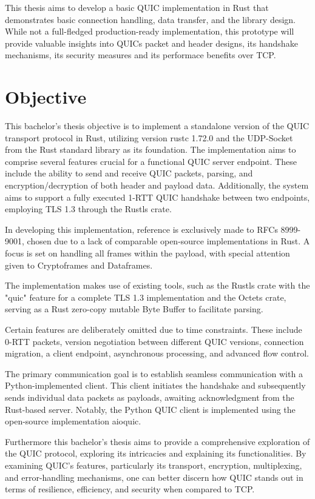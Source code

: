 This thesis aims to develop a basic QUIC implementation in Rust that demonstrates basic connection
handling, data transfer, and the library design. While not a full-fledged production-ready
implementation, this prototype will provide valuable insights into QUICs packet and header designs,
its handshake mechanisms, its security measures and its performace benefits over TCP.

\section{Objective}

This bachelor's thesis objective is to implement a standalone version of the QUIC transport protocol in Rust,
utilizing version rustc 1.72.0 and the UDP-Socket from the Rust standard library as its foundation. The
implementation aims to comprise several features crucial for a functional QUIC server endpoint. These include
the ability to send and receive QUIC packets, parsing, and encryption/decryption of both header and payload data.
Additionally, the system aims to support a fully executed 1-RTT QUIC handshake between two endpoints, employing
TLS 1.3 through the Rustls crate.

In developing this implementation, reference is exclusively made to RFCs 8999-9001, chosen due to a lack of
comparable open-source implementations in Rust. A focus is set on handling all frames within the payload,
with special attention given to Cryptoframes and Dataframes.

The implementation makes use of existing tools, such as the Rustls crate with the "quic" feature for a
complete TLS 1.3 implementation and the Octets crate, serving as a Rust zero-copy mutable Byte Buffer to
facilitate parsing.

Certain features are deliberately omitted due to time constraints. These include 0-RTT packets, version
negotiation between different QUIC versions, connection migration, a client endpoint, asynchronous processing,
and advanced flow control.

The primary communication goal is to establish seamless communication with a Python-implemented client.
This client initiates the handshake and subsequently sends individual data packets as payloads, awaiting
acknowledgment from the Rust-based server. Notably, the Python QUIC client is implemented using the open-source
implementation aioquic.

Furthermore this bachelor's thesis aims to provide a comprehensive exploration of the QUIC protocol, exploring
its intricacies and explaining its functionalities. By examining QUIC's features, particularly its transport,
encryption, multiplexing, and error-handling mechanisms, one can better discern how QUIC stands out in terms
of resilience, efficiency, and security when compared to TCP.

